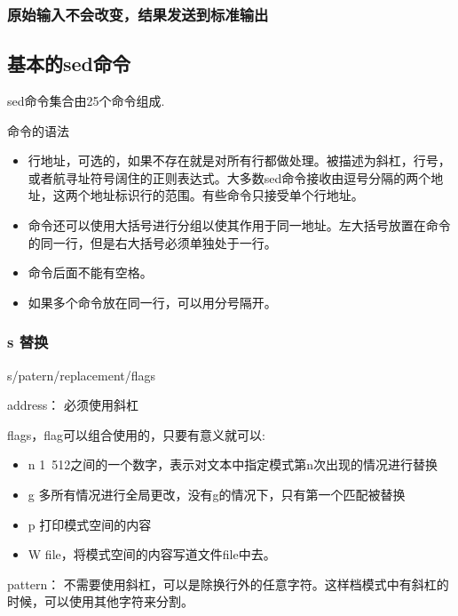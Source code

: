 \subsubsection{原始输入不会改变，结果发送到标准输出}


\subsection{基本的sed命令}

sed命令集合由25个命令组成.

命令的语法


\begin{itemize}
\item 行地址，可选的，如果不存在就是对所有行都做处理。被描述为斜杠，行号，或者航寻址符号阔住的正则表达式。大多数sed命令接收由逗号分隔的两个地址，这两个地址标识行的范围。有些命令只接受单个行地址。

\item 命令还可以使用大括号进行分组以使其作用于同一地址。左大括号放置在命令的同一行，但是右大括号必须单独处于一行。

\item 命令后面不能有空格。

\item 如果多个命令放在同一行，可以用分号隔开。



\end{itemize}

\subsubsection{s 替换}


\begin{Command-Line}
[address]s/patern/replacement/flags
\end{Command-Line}

address：
必须使用斜杠

flags，flag可以组合使用的，只要有意义就可以:
\begin{itemize}
\item n 1~512之间的一个数字，表示对文本中指定模式第n次出现的情况进行替换
\item g 多所有情况进行全局更改，没有g的情况下，只有第一个匹配被替换
\item p 打印模式空间的内容
\item W file，将模式空间的内容写道文件file中去。
\end{itemize}

pattern：
不需要使用斜杠，可以是除换行外的任意字符。这样档模式中有斜杠的时候，可以使用其他字符来分割。

